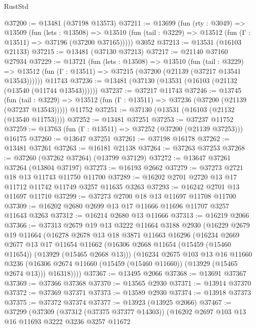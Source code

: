 \begin{lexlean}{RustStd}
\begin{coremodule}
@37200 := @13481 (@37198 @13573)
@37211 := @13699
    (fun (rty : @3049) =>
    @13509
      (fun (lets : @13508) =>
      @13510 (fun (tail : @3229) => @13512 (fun (Γ : @13511) => @37196 (@37200 @37165)))))
    @3052
@37213 := @13531 (@16103 @21133)
@37215 := @13481 (@37130 @37213)
@37217 := @21140 @37160 @27934
@37229 := @13721
    (fun (lets : @13508) =>
    @13510
      (fun (tail : @3229) =>
      @13512 (fun (Γ : @13511) => @37215 (@37200 (@21139 (@37217 @13541 @13543))))))
    @11743
@37236 := @13481 (@37130 (@13531 (@16103 (@21132 (@13540 (@11744 @13543))))))
@37237 := @37217 @11743
@37246 := @13745
    (fun (tail : @3229) => @13512 (fun (Γ : @13511) => @37236 (@37200 (@21139 (@37237 @13543)))))
    @11752
@37251 := @37130 (@13531 (@16103 (@21132 (@13540 @11753))))
@37252 := @13481 @37251
@37253 := @37237 @11752
@37259 := @13763 (fun (Γ : @13511) => @37252 (@37200 (@21139 @37253))) @16175
@37260 := @13647 @37251
@37261 := @37198 @16178
@37262 := @13481 @37261
@37263 := @16181 @21138
@37264 := @37263 @37253
@37268 := @37260 (@37262 @37264) (@13799 @37129)
@37272 := @13647 @37261 @37264 (@13804 @37197)
@37273 := @16193 @2662
@37279 := @37273 @2721 @18 @13 @11743 @11750 @11700
@37289 := @16202 @2701 @2720 @13 @17 @11712 @11742 @11749 @3257 @11635 @3263
@37293 := @16242 @2701 @13 @11697 @11710
@37299 := @37273 @2700 @18 @13 @11697 @11708 @11700
@37309 := @16202 @2680 @2699 @13 @17 @11666 @11696 @11707 @3257 @11643 @3263
@37312 := @16214 @2680 @13 @11666
@37313 := @16219 @2066
@37366 := @37313
    @2679
    @19
    @13
    @3222
    @11664
    @3188
    @2930
    (@16229
      @2679
      @19
      @11664
      (@16278
        @2678
        @13
        @18
        @3871
        @11663
        @16296
        (@16234
          @2669
          @2677
          @13
          @17
          @11654
          @11662
          (@16306 @2668 @11654 (@15459 (@15460 @11654)) (@13929 (@15465 @2668 @13)))
          (@16234
            @2675
            @103
            @13
            @16
            @11660
            @3236
            (@16306 @2674 @11660 (@15459 (@15460 @11660)) (@13929 (@15465 @2674 @13)))
            @16318))))
@37367 := @13495 @2066
@37368 := @13691 @37367
@37369 := @37366 @37368
@37370 := @13565 @2930
@37371 := @13914 @37370
@37372 := @37369 @37371
@37373 := @13589 @2930
@37374 := @13918 @37373
@37375 := @37372 @37374
@37377 := @13923 (@13925 @2066)
@37467 := @37299
    (@37309
      (@37312 (@37375 @37377 @14303))
      (@16202
        @2697
        @103
        @13
        @16
        @11693
        @3222
        @3236
        @3257
        @11672

\end{coremodule}
\end{lexlean}
